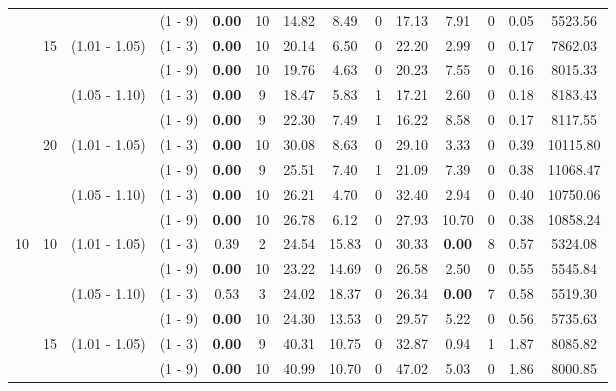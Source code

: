 \documentclass[a4paper,11pt]{article}
\begin{document}
\begin{table}[!ht]
\begin{tabular}{|c|c|c|c|c|c|c|c|c|c|c|c|c|c|}
 &  &  & 				 (1 - 9)  &  \textbf{0.00}  & 10 &		14.82      &  8.49  	    &  0	&  17.13      &  7.91 &		0     &  0.05      &  5523.56  \\
 & 	15 & (1.01 - 1.05) & (1 - 3)  &  \textbf{0.00}  & 10 &		20.14      &  6.50  	    &  0	&  22.20      &  2.99 &		0     &  0.17      &  7862.03  \\
 &  &  & 				 (1 - 9)  &  \textbf{0.00}  & 10 &		19.76      &  4.63 		    &  0	&  20.23      &  7.55 &		0     &  0.16      &  8015.33  \\
 &  & 	 (1.05 - 1.10) & (1 - 3)  &  \textbf{0.00}  & 9 &		18.47      &  5.83  	    &  1    &  17.21      &  2.60 &		0     &  0.18      &  8183.43  \\
 &  &  & 				 (1 - 9)  &  \textbf{0.00}  & 9 &		22.30      &  7.49  	    &  1	&  16.22      &  8.58 &		0     &  0.17      &  8117.55  \\
 & 	20 & (1.01 - 1.05) & (1 - 3)  &  \textbf{0.00} & 10 &		30.08      &  8.63  	    &  0	&  29.10      &  3.33 &		0     &  0.39      &  10115.80 \\
 &  &  & 				 (1 - 9)  &  \textbf{0.00} & 9 &		25.51      &  7.40  	    &  1	&  21.09      &  7.39 &		0     &  0.38      &  11068.47 \\
 &  & 	 (1.05 - 1.10) & (1 - 3)  &  \textbf{0.00} & 10 &		26.21      &  4.70  	    &  0	&  32.40      &  2.94 &		0     &  0.40      &  10750.06 \\
 &  &  & 				 (1 - 9)  &  \textbf{0.00} & 10 &		26.78      &  6.12  	    &  0	&  27.93      &  10.70 &		0  	 &  0.38      &  10858.24 \\
10& 10 & (1.01 - 1.05) & (1 - 3)  &  0.39  		   &  2&		24.54      &  15.83  	    &  0	&  30.33      &  \textbf{0.00} &	8 &  0.57      &  5324.08 \\
 &  &  & 				 (1 - 9)  &  \textbf{0.00}  & 10&		23.22      &  14.69  	    &  0	&  26.58      &  2.50  &	0	  &     0.55      &  5545.84 \\
 &  & 	 (1.05 - 1.10) & (1 - 3)  &  0.53  		   &  3&		24.02      &  18.37  	    &  0	&  26.34      &  \textbf{0.00} & 7 &   0.58      &  5519.30 \\
 &  &  & 				 (1 - 9)  &  \textbf{0.00}  & 10 &		24.30      &  13.53  	    &  0	&  29.57      &  5.22  & 0 	&  0.56      &  5735.63 \\
 & 15 &  (1.01 - 1.05) & (1 - 3)  &  \textbf{0.00}  & 9 &		40.31      &  10.75  	    &  0	&  32.87      &  0.94  & 1 	&  1.87      &  8085.82 \\
 &  &  & 				 (1 - 9)  &  \textbf{0.00}  & 10 &		40.99      &  10.70  	    &  0	&  47.02      &  5.03  & 0 	&  1.86      &  8000.85 \\

\end{tabular}
\end{table}
\end{document}

